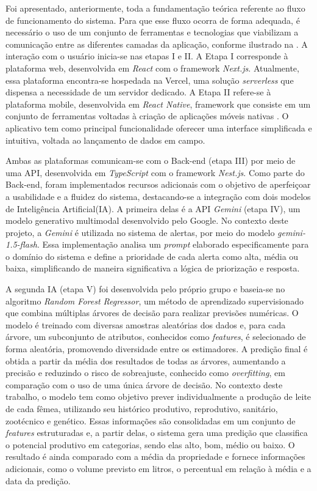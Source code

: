 Foi apresentado, anteriormente, toda a fundamentação teórica referente ao fluxo de funcionamento do sistema. Para que esse fluxo ocorra de forma adequada, é necessário o uso de um conjunto de ferramentas e tecnologias que viabilizam a comunicação entre as diferentes camadas da aplicação, conforme ilustrado na . A interação com o usuário inicia-se nas etapas I e II. A Etapa I corresponde à plataforma web, desenvolvida em \textit{React} com o framework \textit{Next.js}. Atualmente, essa plataforma encontra-se hospedada na Vercel, uma solução \textit{serverless} que dispensa a necessidade de um servidor dedicado. A Etapa II refere-se à plataforma mobile, desenvolvida em \textit{React Native}, framework que consiste em um conjunto de ferramentas voltadas à criação de aplicações móveis nativas \cite{Bruna2021}. O aplicativo tem como principal funcionalidade oferecer uma interface simplificada e intuitiva, voltada ao lançamento de dados em campo.

Ambas as plataformas comunicam-se com o Back-end (etapa III) por meio de uma API, desenvolvida em \textit{TypeScript} com o framework \textit{Nest.js}. Como parte do Back-end, foram implementados recursos adicionais com o objetivo de aperfeiçoar a usabilidade e a fluidez do sistema, destacando-se a integração com dois modelos de Inteligência Artificial(IA). A primeira delas é a API \textit{Gemini} (etapa IV), um modelo generativo multimodal desenvolvido pelo Google. No contexto deste projeto, a \textit{Gemini} é utilizada no sistema de alertas, por meio do modelo \textit{gemini-1.5-flash}. Essa implementação analisa um \textit{prompt} elaborado especificamente para o domínio do sistema e define a prioridade de cada alerta como alta, média ou baixa, simplificando de maneira significativa a lógica de priorização e resposta.

A segunda IA (etapa V) foi desenvolvida pelo próprio grupo e baseia-se no algoritmo \textit{Random Forest Regressor}, um método de aprendizado supervisionado que combina múltiplas árvores de decisão para realizar previsões numéricas. O modelo é treinado com diversas amostras aleatórias dos dados e, para cada árvore, um subconjunto de atributos, conhecidos como \textit{features}, é selecionado de forma aleatória, promovendo diversidade entre os estimadores. A predição final é obtida a partir da média dos resultados de todas as árvores, aumentando a precisão e reduzindo o risco de sobreajuste, conhecido como \textit{overfitting}, em comparação com o uso de uma única árvore de decisão. No contexto deste trabalho, o modelo tem como objetivo prever individualmente a produção de leite de cada fêmea, utilizando seu histórico produtivo, reprodutivo, sanitário, zootécnico e genético. Essas informações são consolidadas em um conjunto de \textit{features} estruturadas e, a partir delas, o sistema gera uma predição que classifica o potencial produtivo em categorias, sendo elas alto, bom, médio ou baixo. O resultado é ainda comparado com a média da propriedade e fornece informações adicionais, como o volume previsto em litros, o percentual em relação à média e a data da predição.

